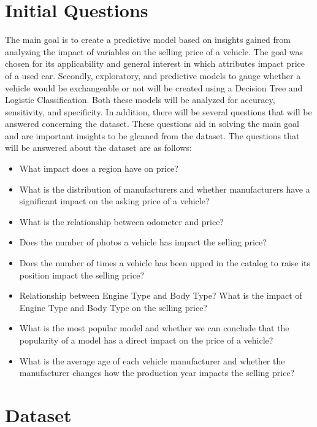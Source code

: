 \documentclass[
]{article}
\providecommand{\tightlist}{%
  \setlength{\itemsep}{0pt}\setlength{\parskip}{0pt}}
\begin{document}
\hypertarget{initial-questions}{%
\section{Initial Questions}\label{initial-questions}}

The main goal is to create a predictive model based on insights gained
from analyzing the impact of variables on the selling price of a
vehicle. The goal was chosen for its applicability and general interest
in which attributes impact price of a used car. Secondly, exploratory,
and predictive models to gauge whether a vehicle would be exchangeable
or not will be created using a Decision Tree and Logistic
Classification. Both these models will be analyzed for accuracy,
sensitivity, and specificity. In addition, there will be several
questions that will be answered concerning the dataset. These questions
aid in solving the main goal and are important insights to be gleaned
from the dataset. The questions that will be answered about the dataset
are as follows:

\begin{itemize}
\tightlist
\item
  What impact does a region have on price?
\item
  What is the distribution of manufacturers and whether manufacturers
  have a significant impact on the asking price of a vehicle?
\item
  What is the relationship between odometer and price?
\item
  Does the number of photos a vehicle has impact the selling price?
\item
  Does the number of times a vehicle has been upped in the catalog to
  raise its position impact the selling price?
\item
  Relationship between Engine Type and Body Type? What is the impact of
  Engine Type and Body Type on the selling price?
\item
  What is the most popular model and whether we can conclude that the
  popularity of a model has a direct impact on the price of a vehicle?
\item
  What is the average age of each vehicle manufacturer and whether the
  manufacturer changes how the production year impacts the selling
  price?
\end{itemize}

\hypertarget{dataset}{%
\section{Dataset}\label{dataset}}
\end{document}
